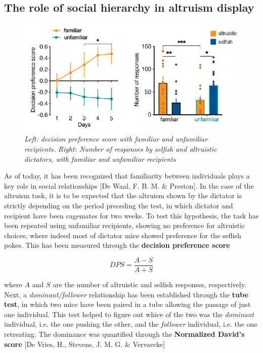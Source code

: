 \documentclass[a4paper]{article}
\begin{document}
\subsection{The role of social hierarchy in altruism display}

\begin{figure}[H]
	\begin{center}
		\includegraphics[scale=0.6]{familiar.png} 
	\end{center} 
	\caption{\textit{Left: decision preference score with familiar and unfamiliar recipients. Right: Number of responses by selfish and altruistic dictators, with familiar and unfamiliar recipients}}
	
\end{figure}

As of today, it has been recognized that familiarity between individuals plays a key role in social relationships [De Waal, F. B. M. \& Preston]. In the case of the altruism task, it is to be expected that the altruism shown by the dictator is strictly depending on the period preceding the test, in which dictator and recipient have been cagemates for two weeks. To test this hypothesis, the task has been repeated using unfamiliar recipients, showing no preference for altruistic choices, where indeed most of dictator mice showed preference for the seflish pokes. This has been measured through the \textbf{decision preference score} 

\begin{equation}
DPS = \frac{A -S}{A+S}
\end{equation}

where $A$ and $S$ are the number of altruistic and selfish responses, respectively.\\
Next, a \textit{dominant/follower} relationship has been established through the \textbf{tube test}, in which two mice have been paired in a tube allowing the passage of just one individual. This test helped to figure out whice of the two was the \textit{dominant} individual, i.e. the one pushing the other, and the \textit{follower} individual, i.e. the one retreating. The dominance was quantified through the \textbf{Normalized David's score} [De Vries, H., Stevens, J. M. G. \& Vervaecke]
\end{document}
